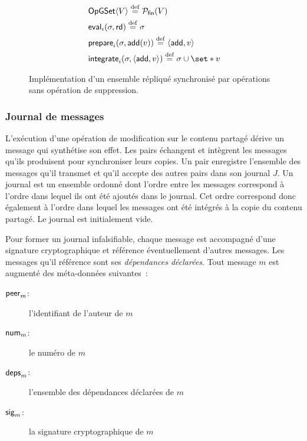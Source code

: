\begin{figure}[bth]
\centering
\begin{align}
&\trm{OpGSet}\tuple*{V} \defeq \powerfset{V} \label{eq:op-gset-state}\\
&\trm{eval}_i(\sigma, \trm{rd}) \defeq \sigma \label{eq:op-gset-eval}\\
&\trm{prepare}_i(\sigma, \trm{add}(v)) \defeq \tuple*{\trm{add}, v} \label{eq:op-gset-prep-add}\\
&\trm{integrate}_i(\sigma, \tuple*{\trm{add}, v}) \defeq \sigma \cup \set*{v} \label{eq:op-gset-integr-add}
\end{align}
\caption[Implémentation d'un ensemble répliqué synchronisé par opérations sans opération de suppression]{Implémentation d'un ensemble répliqué synchronisé par opérations sans opération de suppression.}\label{fig:op-gset}
\end{figure}


\subsubsection{Journal de messages}

L'exécution d'une opération de modification sur le contenu partagé dérive un message qui synthétise son effet.
Les pairs échangent et intègrent les messages qu'ils produisent pour synchroniser leurs copies.
Un pair enregistre l'ensemble des messages qu'il transmet et qu'il accepte des autres pairs dans son journal $J$.
Un journal est un ensemble ordonné dont l'ordre entre les messages correspond à l'ordre dans lequel ils ont été ajoutés dans le journal.
Cet ordre correspond donc également à l'ordre dans lequel les messages ont été intégrés à la copie du contenu partagé.
Le journal est initialement vide.

Pour former un journal infalsifiable, chaque message est accompagné d'une signature cryptographique et référence éventuellement d'autres messages.
Les messages qu'il référence sont ses \emph{dépendances déclarées}.
Tout message $m$ est augmenté des méta-données suivantes~:
\begin{description}
    \item[$\operatorname{\mathsf{peer}}_m$:] l'identifiant de l'auteur de $m$ 
    \item[$\operatorname{\mathsf{num}}_m$:] le numéro de $m$
    \item[$\operatorname{\mathsf{deps}}_m$:] l'ensemble des dépendances déclarées de $m$
    \item[$\operatorname{\mathsf{sig}}_m$:] la signature cryptographique de $m$
\end{description}

